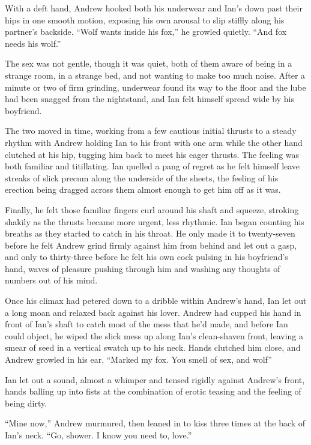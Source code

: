 \documentclass[12pt,letterpaper,oneside]{memoir}
\begin{document}
  With a deft hand, Andrew hooked both his underwear and Ian's down past their hips in one smooth motion, exposing his own arousal to slip stiffly along his partner's backside. ``Wolf wants inside his fox,'' he growled quietly. ``And fox needs his wolf.''

  The sex was not gentle, though it was quiet, both of them aware of being in a strange room, in a strange bed, and not wanting to make too much noise. After a minute or two of firm grinding, underwear found its way to the floor and the lube had been snagged from the nightstand, and Ian felt himself spread wide by his boyfriend.

  The two moved in time, working from a few cautious initial thrusts to a steady rhythm with Andrew holding Ian to his front with one arm while the other hand clutched at his hip, tugging him back to meet his eager thrusts. The feeling was both familiar and titillating. Ian quelled a pang of regret as he felt himself leave streaks of slick precum along the underside of the sheets, the feeling of his erection being dragged across them almost enough to get him off as it was.

  Finally, he felt those familiar fingers curl around his shaft and squeeze, stroking shakily as the thrusts became more urgent, less rhythmic. Ian began counting his breaths as they started to catch in his throat. He only made it to twenty-seven before he felt Andrew grind firmly against him from behind and let out a gasp, and only to thirty-three before he felt his own cock pulsing in his boyfriend's hand, waves of pleasure pushing through him and washing any thoughts of numbers out of his mind.

  Once his climax had petered down to a dribble within Andrew's hand, Ian let out a long moan and relaxed back against his lover. Andrew had cupped his hand in front of Ian's shaft to catch most of the mess that he'd made, and before Ian could object, he wiped the slick mess up along Ian's clean-shaven front, leaving a smear of seed in a vertical swatch up to his neck. Hands clutched him close, and Andrew growled in his ear, ``Marked my fox. You smell of sex, and wolf''

  Ian let out a sound, almost a whimper and tensed rigidly against Andrew's front, hands balling up into fists at the combination of erotic teasing and the feeling of being dirty.

  ``Mine now,'' Andrew murmured, then leaned in to kiss three times at the back of Ian's neck. ``Go, shower. I know you need to, love.''
\end{document}
